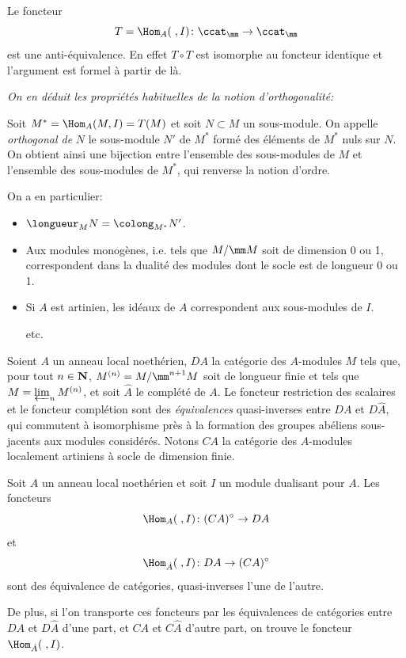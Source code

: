 Le foncteur
$$
T=\Hom_{A}(\;, I)\colon \ccat_{\mm}\to \ccat_{\mm}
$$
est une anti-\'equivalence. En effet $T\circ T$ est isomorphe au foncteur identique et l'argument est formel \`a partir de l\`a.

\emph{On en déduit les propriétés habituelles de la notion d'orthogonalité:}

Soit $M^{*}=\Hom_{A}(M, I)=T(M)$ et soit $N\subset M$ un sous-module. On appelle \emph{orthogonal de} $N$ le sous-module $N'$ de $M^{*}$ form\'e des \'el\'ements de $M^*$ nuls sur $N$. On obtient ainsi une bijection entre l'ensemble des sous-modules de $M$ et l'ensemble des sous-modules de $M^{*}$, qui renverse la notion d'ordre.

On a en particulier:
\begin{itemize}
\item
$\longueur_{M}N=\colong_{M^{*}}N'$.
\item
Aux modules monog\`enes, i.e. tels que $M/\mm M$ soit de dimension 0 ou 1, correspondent dans la dualit\'e des modules dont le socle est de longueur 0 ou 1.
\item
Si $A$ est artinien, les id\'eaux de $A$ correspondent aux sous-modules de $I$.
\par\hfill etc.
\end{itemize}

\smallskip
Soient $A$ un anneau local noeth\'erien, $DA$ la cat\'egorie des $A$-modules $M$ tels que, pour tout $n\in {\bf N}$, $M^{(n)}=M/\mm^{n+1}M$ soit de longueur finie et tels que $M=\varprojlim_{n}M^{(n)}$, et soit $\hat{A}$ le compl\'et\'e de $A$. Le foncteur restriction des scalaires et le foncteur compl\'etion sont des \emph{équivalences} quasi-inverses entre $DA$ et $D\hat{A}$, qui commutent \`a isomorphisme pr\`es \`a la formation des groupes ab\'eliens sous-jacents aux modules consid\'er\'es. Notons $CA$ la cat\'egorie des $A$-modules localement artiniens \`a socle de dimension finie.

\begin{proposition} \label{IV.5.1}
Soit $A$ un anneau local noeth\'erien et soit $I$ un module dualisant pour $A$. Les foncteurs
$$
\Hom_{A}(\;, I)\colon (CA)^{\circ}\to DA
$$
et
$$
\Hom_{\hat{A}}(\;, I)\colon DA\to (CA)^{\circ}
$$
sont des \'equivalence de cat\'egories, quasi-inverses l'une de l'autre.

De plus, si l'on transporte ces foncteurs par les \'equivalences de cat\'egories entre $DA$ et $D\hat{A}$ d'une part, et $CA$ et $C\hat{A}$ d'autre part, on trouve le foncteur $\Hom_{\hat{A}}(\;, I)$.
\end{proposition}

